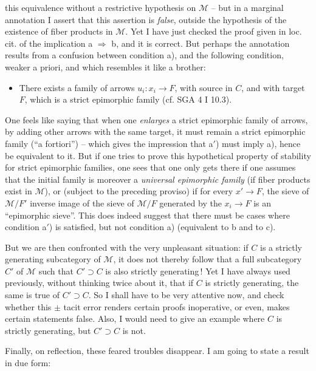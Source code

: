 this equivalence without a restrictive hypothesis on $\mathcal{M}$ – but in a marginal annotation I assert that this assertion is \textit{false}, outside the hypothesis of the existence of fiber products in $\mathcal{M}$. Yet I have just checked the proof given in loc. cit. of the implication a $\Longrightarrow$ b, and it is correct. But perhaps the annotation results from a confusion between condition a), and the following condition, weaker a priori, and which resembles it like a brother:
\begin{itemize}[label={}]
\item[a$'$)] There exists a family of arrows $u_i : x_i \longrightarrow F$, with source in $C$, and with target $F$, which is a strict epimorphic family (cf. SGA 4 I 10.3).
\end{itemize}
One feels like saying that when one \textit{enlarges} a strict epimorphic family of arrows, by adding other arrows with the same target, it must remain a strict epimorphic family (``a fortiori'') – which gives the impression that a$'$) must imply a), hence be equivalent to it. But if one tries to prove this hypothetical property %
of stability for strict epimorphic families, one sees that one only gets there if one assumes that the initial family is moreover a \textit{universal epimorphic family} (if fiber products exist in $\mathcal{M}$), or (subject to the preceding proviso) if for every $x' \longrightarrow F$, the sieve of $\mathcal{M}/F'$ inverse image of the sieve of $\mathcal{M}/F$ generated by the $x_i \longrightarrow F$ is an ``epimorphic sieve''. This does indeed suggest that there must be cases where condition a$'$) is satisfied, but not condition a) (equivalent to b and to c).

But we are then confronted with the very unpleasant situation: if $C$ is a strictly generating subcategory of $\mathcal{M}$, it does not thereby follow that a full subcategory $C'$ of $\mathcal{M}$ such that $C' \supset C$ is also strictly generating\,! Yet I have always used previously, without thinking twice about it, that if $C$ is strictly generating, the same is true of $C' \supset C$. So I shall have to be very attentive now, %
and check whether this $\pm$ tacit error renders certain proofs inoperative, or even, makes certain statements false. Also, I would need to give an example where $C$ is strictly generating, but $C' \supset C$ is not.

Finally, on reflection, these feared troubles disappear. I am going to state a result in due form:

